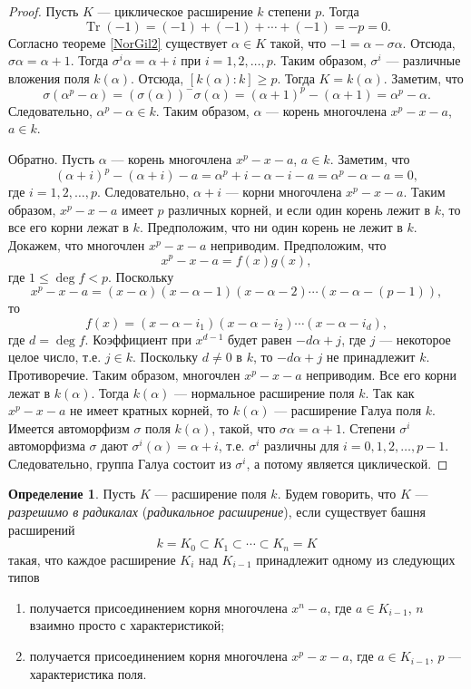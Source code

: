 \documentclass[12pt, titlepage, oneside]{amsbook}
\newcommand{\Tr}{\operatorname{Tr}}
\theoremstyle{definition}
\newtheorem{definition}[theorem]{Определение}
\theoremstyle{remark}
\begin{document}
\begin{proof}
Пусть $K$ --- циклическое расширение $k$ степени $p$. Тогда $$\Tr(-1)=(-1)+(-1)+\cdots+(-1)=-p=0.$$ Согласно теореме \ref{NorGil2} существует $\alpha\in K$ такой, что $-1=\alpha-\sigma\alpha$. Отсюда, $\sigma\alpha=\alpha+1$. Тогда $\sigma^i\alpha=\alpha+i$ при $i=1,2,\ldots,p$. Таким образом, $\sigma^i$ --- различные вложения поля $k(\alpha)$. Отсюда, $[k(\alpha):k]\geq p$. Тогда $K=k(\alpha)$. Заметим, что $$\sigma(\alpha^p-\alpha)=(\sigma(\alpha))^-\sigma(\alpha)=(\alpha+1)^p-(\alpha+1)=\alpha^p-\alpha.$$ Следовательно, $\alpha^p-\alpha\in k$. Таким образом, $\alpha$ --- корень многочлена $x^p-x-a$, $a\in k$.

Обратно. Пусть $\alpha$ --- корень многочлена $x^p-x-a$, $a\in k$. Заметим, что $$(\alpha+i)^p-(\alpha+i)-a=\alpha^p+i-\alpha-i-a=\alpha^p-\alpha-a=0,$$ где $i=1,2,\ldots,p$. Следовательно, $\alpha+i$ --- корни многочлена  $x^p-x-a$. Таким образом, $x^p-x-a$ имеет $p$ различных корней, и если один корень лежит в $k$, то все его корни лежат в $k$. Предположим, что ни один корень не лежит в $k$. Докажем, что многочлен $x^p-x-a$ неприводим. Предположим, что $$x^p-x-a=f(x)g(x),$$ где $1\leq\deg f<p$. Поскольку $$x^p-x-a=(x-\alpha)(x-\alpha-1)(x-\alpha-2)\cdots(x-\alpha-(p-1)),$$ то $$f(x)=(x-\alpha-i_1)(x-\alpha-i_2)\cdots(x-\alpha-i_d),$$ где $d=\deg f$. Коэффициент при $x^{d-1}$ будет равен $-d\alpha+j$, где $j$ --- некоторое целое число, т.е. $j\in k$. Поскольку $d\neq 0$ в $k$, то $-d\alpha+j$ не принадлежит $k$. Противоречие. Таким образом, многочлен $x^p-x-a$ неприводим. Все его корни лежат в $k(\alpha)$. Тогда $k(\alpha)$ --- нормальное расширение поля $k$. Так как $x^p-x-a$ не имеет кратных корней, то $k(\alpha)$ --- расширение Галуа поля $k$. Имеется автоморфизм $\sigma$ поля $k(\alpha)$, такой, что $\sigma\alpha=\alpha+1$. Степени $\sigma^i$ автоморфизма $\sigma$ дают $\sigma^i(\alpha)=\alpha+i$, т.е.  $\sigma^i$ различны для $i=0,1,2,\ldots,p-1$. Следовательно, группа Галуа состоит из $\sigma^i$, а потому является циклической.
\end{proof}

\begin{definition}
Пусть $K$ --- расширение поля $k$. Будем говорить, что $K$ --- \emph{разрешимо в радикалах} (\emph{радикальное расширение}), если существует башня расширений $$k=K_0\subset K_1\subset\cdots\subset K_n=K$$ такая, что каждое расширение $K_i$ над $K_{i-1}$ принадлежит одному из следующих типов
\begin{enumerate}
\item получается присоединением корня многочлена $x^n-a$, где $a\in K_{i-1}$, $n$ взаимно просто с характеристикой;
\item получается присоединением корня многочлена $x^p-x-a$, где $a\in K_{i-1}$, $p$ --- характеристика поля.
\end{enumerate}
\end{definition}
\end{document}

